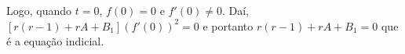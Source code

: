 \documentclass[a4paper,12pt, leqno, answers]{exam}
\begin{document}
\begin{questions}
\begin{solution}
        Logo, quando $t = 0$, $f(0) = 0$ e $f'(0) \neq 0$. Da\'{i}, $\left[ r \left( r - 1 \right) + r A + B_1 \right] \left( f'(0) \right)^2 = 0$ e portanto $r \left( r - 1 \right) + r A + B_1 = 0$ que \'{e} a equa\c{c}\~{a}o indicial.
    \end{solution}
\end{questions}
\end{document}
